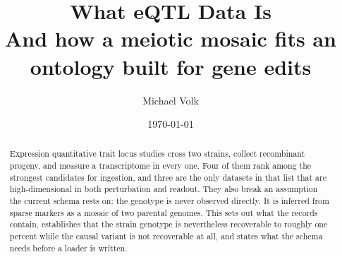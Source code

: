 \documentclass[10pt,a4paper]{article}
\title{\vspace{-1.5em}What eQTL Data Is\\
  {\large And how a meiotic mosaic fits an ontology built for gene edits}}
\author{Michael Volk}
\date{\today}
\begin{document}
\maketitle
\thispagestyle{empty}

\begin{abstract}
\noindent
Expression quantitative trait locus studies cross two strains, collect recombinant
progeny, and measure a transcriptome in every one. Four of them rank among the strongest
candidates for ingestion, and three are the only datasets in that list that are
high-dimensional in both perturbation and readout. They also break an assumption the
current schema rests on: the genotype is never observed directly. It is inferred from
sparse markers as a mosaic of two parental genomes. This sets out what the records
contain, establishes that the strain genotype is nevertheless recoverable to roughly one
percent while the causal variant is not recoverable at all, and states what the schema
needs before a loader is written.
\end{abstract}

\vspace{0.5em}
\tccontents
\clearpage




\end{document}
